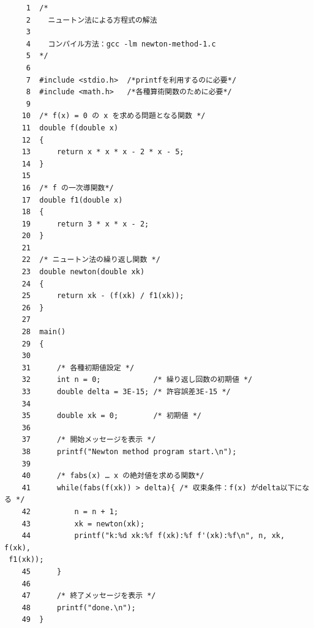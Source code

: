 \documentclass[12pt]{jarticle}
\renewcommand  \[  {\begin{eqnarray}}
\renewcommand  \]  {\end{eqnarray}}
\begin{document}
\begin{verbatim}
     1	/*
     2	  ニュートン法による方程式の解法
     3	
     4	  コンパイル方法：gcc -lm newton-method-1.c
     5	*/
     6	
     7	#include <stdio.h>  /*printfを利用するのに必要*/
     8	#include <math.h>   /*各種算術関数のために必要*/
     9	
    10	/* f(x) = 0 の x を求める問題となる関数 */
    11	double f(double x)
    12	{
    13	    return x * x * x - 2 * x - 5;
    14	}
    15	
    16	/* f の一次導関数*/
    17	double f1(double x)
    18	{
    19	    return 3 * x * x - 2;
    20	}
    21	
    22	/* ニュートン法の繰り返し関数 */
    23	double newton(double xk)
    24	{
    25	    return xk - (f(xk) / f1(xk));
    26	}
    27	
    28	main()
    29	{
    30	
    31	    /* 各種初期値設定 */
    32	    int n = 0;            /* 繰り返し回数の初期値 */
    33	    double delta = 3E-15; /* 許容誤差3E-15 */
    34	
    35	    double xk = 0;        /* 初期値 */
    36	
    37	    /* 開始メッセージを表示 */
    38	    printf("Newton method program start.\n");
    39	
    40	    /* fabs(x) … x の絶対値を求める関数*/
    41	    while(fabs(f(xk)) > delta){ /* 収束条件：f(x) がdelta以下になる */
    42	        n = n + 1;
    43	        xk = newton(xk);
    44	        printf("k:%d xk:%f f(xk):%f f'(xk):%f\n", n, xk, f(xk),
 f1(xk));
    45	    }
    46	
    47	    /* 終了メッセージを表示 */
    48	    printf("done.\n");
    49	}
\end{verbatim}
\end{document}
